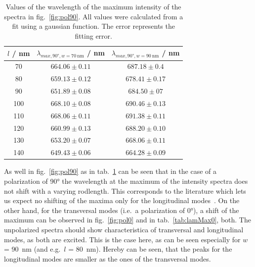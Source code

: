 \begin{table}
    \centering
    \begin{tabular}{c|cc}
        \toprule
        $l$ / \si{\nano\meter} & $\lambda_{max,\ang{90},w=\SI{70}{\nano\meter}}$ / \si{\nano\meter}& $\lambda_{max,\ang{90},w=\SI{90}{\nano\meter}}$ / \si{\nano\meter}\\
        \midrule
        70  &  $664.06\pm 0.11$&  $687.18\pm 0.4$\\
        80  &  $659.13\pm 0.12$&  $678.41\pm 0.17$\\
        90  &  $651.89\pm 0.08$&  $684.50\pm 07$\\
        100 &  $668.10\pm 0.08$&  $690.46\pm 0.13$\\
        110 &  $668.06\pm 0.11$&  $691.38\pm 0.11$\\
        120 &  $660.99\pm 0.13$&  $688.20\pm 0.10$\\
        130 &  $653.20\pm 0.07$&   $668.06\pm 0.11$\\
        140 &  $649.43\pm 0.06$&  $664.28\pm 0.09$\\
        \bottomrule
    \end{tabular}
    \caption{Values of the wavelength of the maximum intensity of the spectra in fig.~\ref{fig:pol90}. All values were calculated from a fit using a gaussian function. The error represents the fitting error.}
    \label{tab:lamMax90}
\end{table}


    
As well in fig.~\ref{fig:pol90} as in tab.~\ref{tab:lamMax90} can be seen that in the case of a polarization of \ang{90} the wavelength at the maximum of the intensity spectra does not shift with a varying rodlength. This corresponds to the literature which lets us expect no shifting of the maxima only for the longitudinal modes~\cite{LehrstuhlExperimentalphysikIII.2023}. On the other hand, for the transversal modes (i.e.~a polarization of \ang{0}), a shift of the maximum can be observed in fig.~\ref{fig:pol0} and in tab.~\ref{tab:lamMax0}, both. The unpolarized spectra should show characteristica of transversal and longitudinal modes, as both are excited. This is the case here, as can be seen especially for $w$ = \SI{90}{\nano\meter} (and e.g.~$l$ = \SI{80}{\nano\meter}). Hereby can be seen, that the peaks for the longitudinal modes are smaller as the ones of the transversal modes.
